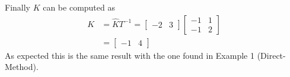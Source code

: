 \documentclass[twoside]{article}
\begin{document}
%
Finally $K$ can be computed as
%
\begin{align*}
  K &= \hat{K} T^{-1} = \left[ \begin{array}{ccc} -2 & 3 \end{array}
                                                       \right]
\left[ \begin{array}{cc} -1 & 1 \\ -1 & 2 \end{array} \right]
\\
&= \left[ \begin{array}{ccc} -1 & 4 \end{array}
                                                       \right]
\end{align*}
%
As expected this is the same result with the one found in Example 1 (Direct-Method).

\end{document}
